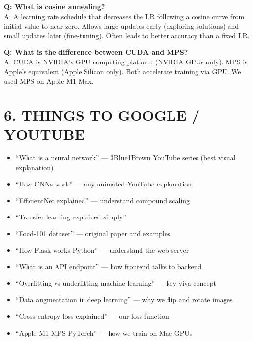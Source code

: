 \documentclass[11pt,a4paper]{article}
\begin{document}
\vspace{0.3cm}

\begin{qabox}
\textbf{Q: What is cosine annealing?}\\[0.2cm]
A: A learning rate schedule that decreases the LR following a cosine curve from initial value to near zero. Allows large updates early (exploring solutions) and small updates later (fine-tuning). Often leads to better accuracy than a fixed LR.
\end{qabox}

\vspace{0.3cm}

\begin{qabox}
\textbf{Q: What is the difference between CUDA and MPS?}\\[0.2cm]
A: CUDA is NVIDIA's GPU computing platform (NVIDIA GPUs only). MPS is Apple's equivalent (Apple Silicon only). Both accelerate training via GPU. We used MPS on Apple M1 Max.
\end{qabox}

\section{6. THINGS TO GOOGLE / YOUTUBE}

\begin{itemize}[leftmargin=1.2cm]
\item ``What is a neural network'' --- 3Blue1Brown YouTube series (best visual explanation)
\item ``How CNNs work'' --- any animated YouTube explanation
\item ``EfficientNet explained'' --- understand compound scaling
\item ``Transfer learning explained simply''
\item ``Food-101 dataset'' --- original paper and examples
\item ``How Flask works Python'' --- understand the web server
\item ``What is an API endpoint'' --- how frontend talks to backend
\item ``Overfitting vs underfitting machine learning'' --- key viva concept
\item ``Data augmentation in deep learning'' --- why we flip and rotate images
\item ``Cross-entropy loss explained'' --- our loss function
\item ``Apple M1 MPS PyTorch'' --- how we train on Mac GPUs
\end{itemize}
\end{document}
